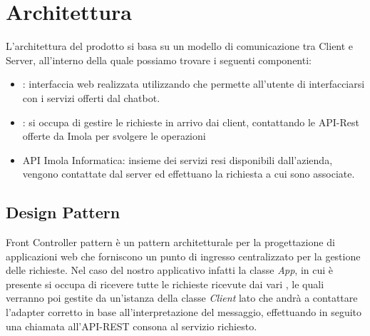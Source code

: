 \section{Architettura}
L'architettura del prodotto si basa su un modello di comunicazione tra Client e Server, all'interno della quale possiamo trovare i seguenti componenti: 
\begin{itemize}
    \item {}: interfaccia web realizzata utilizzando  che permette all'utente di interfacciarsi con i servizi offerti dal chatbot. 
    \item {}: si occupa di gestire le richieste in arrivo dai client, contattando le API-Rest offerte da Imola per svolgere le operazioni
    \item API  Imola Informatica: insieme dei servizi resi disponibili dall'azienda, vengono contattate dal server ed effettuano la richiesta a cui sono associate.  
\end{itemize}




\subsection{Design Pattern}
Front Controller pattern è un pattern architetturale per la progettazione di applicazioni web che forniscono un punto di ingresso centralizzato per la gestione delle richieste. Nel caso del nostro applicativo infatti la classe \textit{App}, in cui è presente  si occupa di ricevere tutte le richieste ricevute dai vari , le quali verranno poi gestite da un'istanza della classe \textit{Client} lato  che andrà a contattare l'adapter corretto in base all'interpretazione del messaggio, effettuando in seguito una chiamata all'API-REST consona al servizio richiesto.
\newpage



